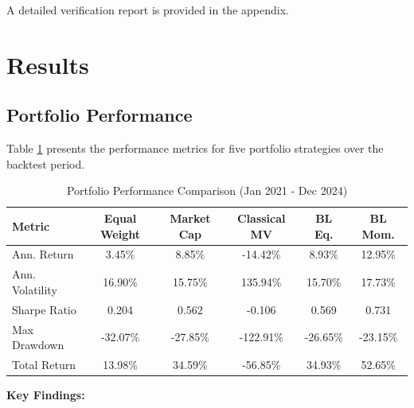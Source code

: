 \documentclass[12pt,a4paper]{article}
\begin{document}
A detailed verification report is provided in the appendix.

\section{Results}

\subsection{Portfolio Performance}

Table \ref{tab:performance} presents the performance metrics for five portfolio strategies over the backtest period.

\begin{table}[H]
\centering
\caption{Portfolio Performance Comparison (Jan 2021 - Dec 2024)}
\label{tab:performance}
\begin{tabular}{lccccc}
\toprule
\textbf{Metric} & \textbf{Equal Weight} & \textbf{Market Cap} & \textbf{Classical MV} & \textbf{BL Eq.} & \textbf{BL Mom.} \\
\midrule
Ann. Return & 3.45\% & 8.85\% & -14.42\% & 8.93\% & 12.95\% \\
Ann. Volatility & 16.90\% & 15.75\% & 135.94\% & 15.70\% & 17.73\% \\
Sharpe Ratio & 0.204 & 0.562 & -0.106 & 0.569 & 0.731 \\
Max Drawdown & -32.07\% & -27.85\% & -122.91\% & -26.65\% & -23.15\% \\
Total Return & 13.98\% & 34.59\% & -56.85\% & 34.93\% & 52.65\% \\
\bottomrule
\end{tabular}
\end{table}

\textbf{Key Findings:}
\end{document}
